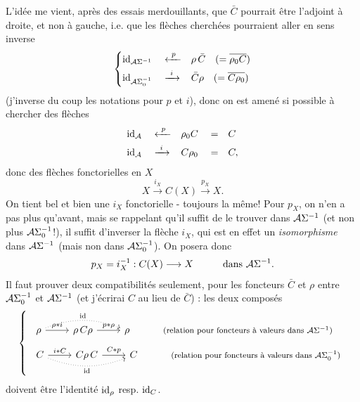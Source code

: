
L'idée me vient, après des essais merdouillants, que $\bar{C}$ pourrait être l'adjoint à droite, et non à gauche, i.e. que les flèches cherchées pourraient aller en sens inverse
\[
\left\{
\begin{aligned}
&\id_{\cA\Sigma^{-1}}&&\xleftarrow{\ p\ }&&\rho\,\bar{C}\quad(=\overline{\rho_0C})\\
&\id_{\cA\Sigma_0^{-1}}&&\xrightarrow{\ i\ }&&\bar{C}\rho\quad(=\overline{C\rho_0})
\end{aligned}
\right.
\]
(j'inverse du coup les notations pour $p$ et $i$), donc on est amené si possible à chercher des flèches
\[
\begin{aligned}
&\id_{\cA}&&\xleftarrow{\ p\ }&&\rho_0C&&=&&C\\
&\id_{\cA}&&\xrightarrow{\ i\ }&&C\rho_0&&=&&C,
\end{aligned}
\]
donc des flèches fonctorielles en $X$
\[
X\xrightarrow{i_X}C(X)\xrightarrow{p_X}X.
\]
On tient bel et bien une $i_X$ fonctorielle - toujours la même! Pour $p_X$, on n'en a pas plus qu'avant, mais se rappelant qu'il suffit de le trouver dans $\mathcal{A}\Sigma^{-1}$ (et non plus $\mathcal{A}\Sigma_0^{-1}$!), il suffit d'inverser la flèche $i_X$, qui est en effet un \textit{isomorphisme} dans $\mathcal{A}\Sigma^{-1}$ (mais non dans $\mathcal{A}\Sigma_0^{-1}$). On posera donc
\[
p_X=i_X^{-1}:C(X)\longrightarrow X\qquad\quad\text{dans }\mathcal{A}\Sigma^{-1}.
\]
Il faut prouver deux compatibilités seulement, pour les foncteurs $\bar{C}$ et $\rho$ entre $\mathcal{A}\Sigma_0^{-1}$ et $\mathcal{A}\Sigma^{-1}$ (et j'écrirai $C$ au lieu de $\bar{C}$) : les deux composés
\[
\left\{
\begin{array}{l}
\begin{tikzcd}[ampersand replacement=\&]
\rho \arrow[r, "\rho*i"] \arrow[rr, bend left=20, dotted, "\id"] \& \rho\,C\rho \arrow[r, "p*\rho"] \& \rho
\end{tikzcd}
\qquad\quad\text{\footnotesize (relation pour foncteurs à valeurs dans $\cA\Sigma^{-1}$)}\\[2ex]
\begin{tikzcd}[ampersand replacement=\&]
C \arrow[r, "i*C"] \arrow[rr, bend right=20, dotted, "\id"'] \& C\rho\,C \arrow[r, "C*p"] \& C
\end{tikzcd}
\qquad\quad\text{\footnotesize (relation pour foncteurs à valeurs dans $\cA\Sigma_0^{-1}$)}
\end{array}
\right.
\]
doivent être l'identité $\mathrm{id}_\rho$ resp. $\mathrm{id}_C$.

